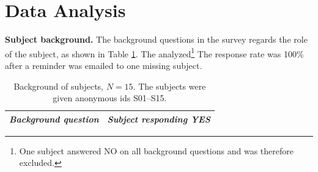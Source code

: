 \documentclass[a4paper]{llncs}
\begin{document}
\section{Data Analysis}

\textbf{Subject background.} The background questions in the survey regards the role of the subject, as shown in Table \ref{table:background}. The analyzed\footnote{One subject answered NO on all background questions and was therefore excluded.}  The response rate was 100\% after a reminder was emailed to one missing subject.


\begingroup
\begin{table}[H]
\setlength{\tabcolsep}{4pt} %
\renewcommand{\arraystretch}{1.4} %
\centering
\fontsize{8.5}{9}\selectfont
\caption{Background of subjects, $N = 15$. The subjects were given anonymous ids S01--S15.}
\label{table:background}
\begin{tabular}{p{}| p{}}
\textit{Background question} & \textit{Subject responding YES}  \\ \hline

 \end{tabular}
\end{table}
\endgroup
\end{document}
